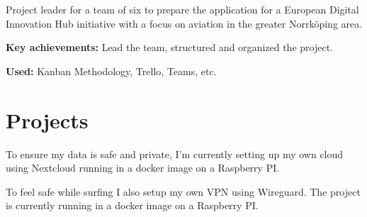 \documentclass[a4paper]{plushcv}
\begin{document}
\begin{minipage}[t]{0.69\textwidth}
\begin{tightemize}
	\item Project leader for a team of six to prepare the application for a European Digital Innovation Hub initiative with a focus on aviation in the greater Norrk\"oping area.
	
	\item \textbf{Key achievements:} Lead the team, structured and organized the project.
	
	\item \textbf{Used:} Kanban Methodology, Trello, Teams, etc.
	
\end{tightemize}



\section{Projects}

\begin{tightemize}
\item To ensure my data is safe and private, I'm currently setting up my own cloud using Nextcloud running in a docker image on a Raspberry PI. 
\end{tightemize}

\begin{tightemize}
\item To feel safe while surfing I also setup my own VPN using Wireguard. The project is currently running in a docker image on a Raspberry PI. 
\end{tightemize}




%
%

\end{minipage} 
\end{document}

